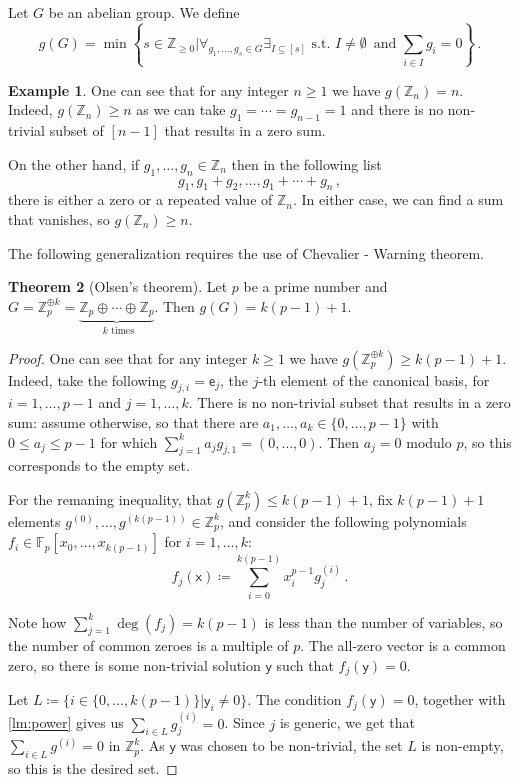 \documentclass[12pt]{amsart}
\theoremstyle{definition}
\newtheorem{thm}{Theorem}[section]
\newtheorem{smpl}[thm]{Example}
\newcommand{\Z}{\mathbb{Z}}
\newcommand{\F}{\mathbb{F}}
\newcommand{\vx}{\mathsf{x}}
\newcommand{\vy}{\mathsf{y}}
\newcommand{\ve}{\mathsf{e}}
\begin{document}
Let $G$ be an abelian group.
We define 
$$g(G) = \min \left\{ s \in \Z_{\geq 0} \Big| \forall_{g_1, \ldots, g_s \in G} \exists_{I \subseteq [s]} \text{ s.t. } I \neq \emptyset \, \text{ and } \sum_{i \in I} g_i = 0 \right\}\, . $$

\begin{smpl}
One can see that for any integer $n \geq 1 $ we have $g(\Z_n) = n$.
Indeed, $g(\Z_n ) \geq n$ as we can take $g_1 = \cdots = g_{n-1} = 1$ and there is no non-trivial subset of $[n-1]$ that results in a zero sum.

On the other hand, if $g_1, \ldots, g_n \in \Z_n $ then in the following list
$$ g_1, g_1 + g_2, \ldots, g_1 + \cdots + g_n \, , $$
there is either a zero or a repeated value of $\Z_n$.
In either case, we can find a sum that vanishes, so $g(\Z_n) \geq n$.
\end{smpl}

The following generalization requires the use of Chevalier - Warning theorem.

\begin{thm}[Olsen's theorem]
Let $p$ be a prime number and $G = \Z_p^{\oplus k} = \underbrace{\Z_p \oplus \cdots \oplus \Z_p}_{\text{ $k$ times } }$.
Then $g(G) = k(p-1)+ 1$.
\end{thm}

\begin{proof}
One can see that for any integer $k \geq 1 $ we have $g(\Z_p^{\oplus k}) \geq k(p-1)+1$.
Indeed, take the following  $g_{j, i} = \ve_j$, the $j$-th element of the canonical basis, for $i=1, \ldots, p-1$ and $j=1, \ldots, k$.
There is no non-trivial subset that results in a zero sum:
assume otherwise, so that there are $a_1, \ldots, a_k \in \{0, \ldots, p-1\}$ with $0 \leq a_j \leq p-1$ for which $\sum_{j=1}^k a_j g_{j, 1} = (0, \ldots,  0) $.
Then $a_j = 0$ modulo $p$, so this corresponds to the empty set.

For the remaning inequality, that $g(\Z_p^k) \leq k(p-1)+1$, fix $k(p-1)+1$ elements $g^{(0)}, \ldots, g^{(k(p-1))} \in \Z_p^k$, and consider the following polynomials $f_i \in \F_p[x_0, \ldots, x_{k(p-1)}]$ for $i = 1, \ldots, k$:
$$f_j(\vx ) \coloneqq \sum_{i=0}^{k(p-1)} x_i^{p-1}g^{(i)}_j \, .$$

Note how $\sum_{j=1}^ k \deg(f_j) = k(p-1)$ is less than the number of variables, so the number of common zeroes is a multiple of $p$.
The all-zero vector is a common zero, so there is some non-trivial solution $\vy$ such that $f_j(\vy) = 0$.

Let $L \coloneqq \{ i\in\{0, \ldots, k(p-1)\} | \vy_i \neq 0 \}$.
The condition $f_j(\vy) = 0$, together with \cref{lm:power} gives us $\sum_{i\in L} g^{(i)}_j = 0$.
Since $j$ is generic, we get that $\sum_{i\in L} g^{(i)} = 0$ in $\Z_p^k$.
As $\vy $ was chosen to be non-trivial, the set $L$ is non-empty, so this is the desired set.
\end{proof}
\end{document}

